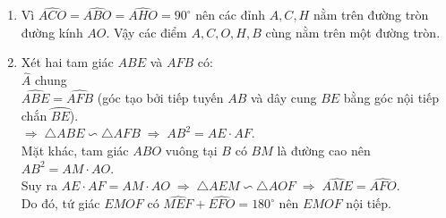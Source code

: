 \begin{ex}
{    \begin{enumerate}
        \item Vì $\widehat{ACO}=\widehat{ABO}=\widehat{AHO}=90^\circ$ nên các đỉnh $A,C,H$ nằm trên đường tròn đường kính $AO$. Vậy các điểm $A,C,O,H,B$ cùng nằm trên một đường tròn.
        \item Xét hai tam giác $ABE$ và $AFB$ có:\\
        $\widehat{A}$ chung\\
        $\widehat{ABE}=\widehat{AFB}$ (góc tạo bởi tiếp tuyến $AB$ và dây cung $BE$ bằng góc nội tiếp chắn $\wideparen{BE}$).\\
        $\Rightarrow\; \triangle{ABE} \backsim \triangle{AFB} \;\Rightarrow\; AB^2=AE\cdot AF$.\\
        Mặt khác, tam giác $ABO$ vuông tại $B$ có $BM$ là đường cao nên $AB^2=AM\cdot AO$.\\
        Suy ra $AE\cdot AF=AM\cdot AO \;\Rightarrow\; \triangle{AEM} \backsim \triangle{AOF} \;\Rightarrow\; \widehat{AME}=\widehat{AFO}$.\\
        Do đó, tứ giác $EMOF$ có $\widehat{MEF}+\widehat{EFO}=180^\circ$ nên $EMOF$ nội tiếp.
    \end{enumerate}
    }
\end{ex}
